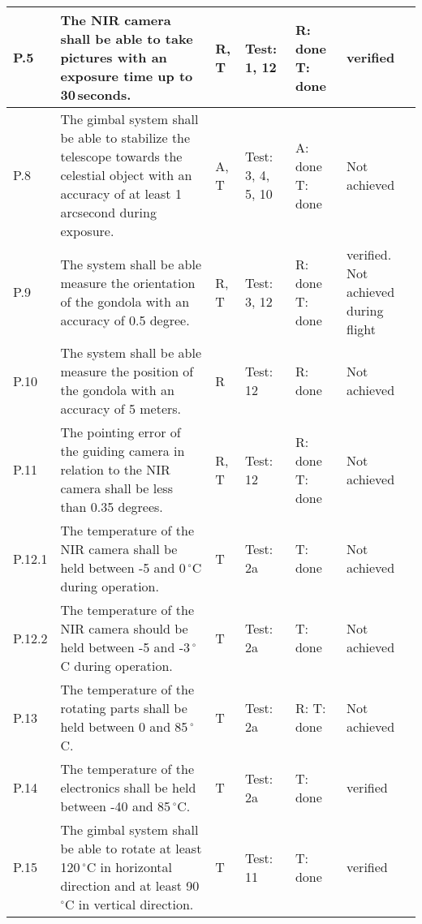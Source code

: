 \begin{longtable}[]{|m{}| m{}|m{}|m{}|m{}|m{}|}
P.5 & The NIR camera shall be able to take pictures with an exposure time up to 30\,seconds.
& R, T & Test: 1, 12 & R: done \newline T: done & verified \\\hline

  P.8 & The gimbal system shall be able to stabilize the telescope towards the celestial object with an accuracy of at least 1 arcsecond during exposure.
& A, T & Test: 3, 4, 5, 10 & A: done \newline T: done & Not achieved \\\hline

  P.9 & The system shall be able measure the orientation of the gondola with an accuracy of 0.5 degree.
& R, T & Test: 3, 12 & R: done \newline T: done  &  verified. Not achieved during flight \\\hline

  P.10 & The system shall be able measure the position of the gondola with an accuracy of 5 meters.
& R & Test: 12 & R: done & Not achieved \\\hline

  P.11 & The pointing error of the guiding camera in relation to the NIR camera shall be less than 0.35 degrees.
& R, T & Test: 12 & R: done \newline T: done& Not achieved \\\hline

  P.12.1 & The temperature of the NIR camera shall be held between -5 and 0\,$^\circ$C during operation.
& T & Test: 2a & T: done & Not achieved \\\hline

  P.12.2 & The temperature of the NIR camera should be held between -5 and -3\,$^\circ$C during operation.
& T & Test: 2a &  T: done & Not achieved \\\hline

  P.13 & The temperature of the rotating parts shall be held between 0 and 85\,$^\circ$C.
& T & Test: 2a & R: T: done & Not achieved \\\hline

  P.14 & The temperature of the electronics shall be held between -40 and 85\,$^\circ$C.
& T & Test: 2a & T: done & verified \\\hline

P.15 & The gimbal system shall be able to rotate at least 120\,$^\circ$C in horizontal direction and at least 90\,$^\circ$C in vertical direction.
& T & Test: 11 & T: done &  verified \\\hline




\end{longtable}
